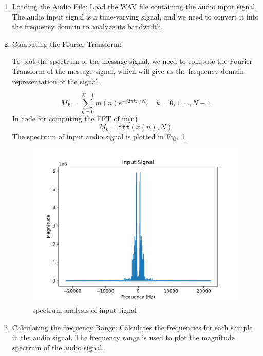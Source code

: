 \documentclass[journal,5pt,twocolumn]{IEEEtran}
\newcommand\figref{Fig.~\ref}
\begin{document}
\begin{enumerate}
\item Loading the Audio File:  Load the WAV file containing the audio input signal.
The audio input signal is a time-varying signal, and we need to convert it into the frequency domain to analyze its bandwidth.



\item Computing the Fourier Transform:

To plot the spectrum of the message signal, we need to compute the Fourier Transform of the message signal, which will give us the frequency domain representation of the signal.

\begin{equation}
M_k = \sum_{n=0}^{N-1} m(n) e^{-j2\pi kn/N}, \quad k=0,1,\dots,N-1
\end{equation}
In code for computing the FFT of m(n)
\begin{equation}
M_k = \texttt{fft}(x(n), N)
\end{equation}
The spectrum of input audio signal is plotted in \figref{fig:input_spectrum}
\begin{figure}
\centering 
\includegraphics[width=\columnwidth]{../figs/inputs.pdf} 
\caption{spectrum analysis of input signal}
\label{fig:input_spectrum}
\end{figure}

\item Calculating the frequency Range: Calculates the frequencies for each sample in the audio signal. The frequency range is used to plot the magnitude spectrum of the audio signal.


\end{enumerate}
\end{document}
